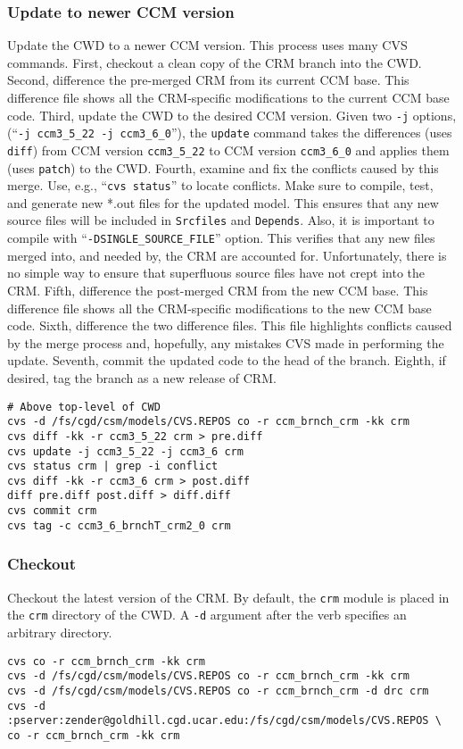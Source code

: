 \documentclass[12pt,twoside]{article}
\begin{document}
\subsubsection[Update]{Update to newer CCM version}
Update the CWD to a newer CCM version.
This process uses many CVS commands.
First, checkout a clean copy of the CRM branch into the CWD.
Second, difference the pre-merged CRM from its current CCM base.
This difference file shows all the CRM-specific modifications to the
current CCM base code.
Third, update the CWD to the desired CCM version.
Given two \verb'-j' options, (``\texttt{-j ccm3\_5\_22 -j
ccm3\_6\_0}''), the \verb'update' command takes the differences (uses
\verb'diff') from CCM version \verb'ccm3_5_22' to CCM version
\verb'ccm3_6_0' and applies them (uses \verb'patch') to the CWD.
Fourth, examine and fix the conflicts caused by this merge.
Use, e.g., ``\texttt{cvs status}'' to locate conflicts.
Make sure to compile, test, and generate new *.out files for the
updated model.
This ensures that any new source files will be included in
\verb'Srcfiles' and \verb'Depends'.
Also, it is important to compile with
``\texttt{-DSINGLE\_SOURCE\_FILE}'' option.
This verifies that any new files merged into, and needed by, the CRM
are accounted for.
Unfortunately, there is no simple way to ensure that superfluous
source files have not crept into the CRM.
Fifth, difference the post-merged CRM from the new CCM base.
This difference file shows all the CRM-specific modifications to the
new CCM base code.
Sixth, difference the two difference files.
This file highlights conflicts caused by the merge process and,
hopefully, any mistakes CVS made in performing the update.
Seventh, commit the updated code to the head of the branch.
Eighth, if desired, tag the branch as a new release of CRM.
\begin{verbatim}
# Above top-level of CWD
cvs -d /fs/cgd/csm/models/CVS.REPOS co -r ccm_brnch_crm -kk crm
cvs diff -kk -r ccm3_5_22 crm > pre.diff
cvs update -j ccm3_5_22 -j ccm3_6 crm
cvs status crm | grep -i conflict
cvs diff -kk -r ccm3_6 crm > post.diff
diff pre.diff post.diff > diff.diff
cvs commit crm
cvs tag -c ccm3_6_brnchT_crm2_0 crm
\end{verbatim}

\subsubsection[Checkout]{Checkout}
Checkout the latest version of the CRM. 
By default, the \verb'crm' module is placed in the \verb'crm'
directory of the CWD. 
A \verb'-d' argument after the verb specifies an arbitrary
directory.
\begin{verbatim}
cvs co -r ccm_brnch_crm -kk crm
cvs -d /fs/cgd/csm/models/CVS.REPOS co -r ccm_brnch_crm -kk crm
cvs -d /fs/cgd/csm/models/CVS.REPOS co -r ccm_brnch_crm -d drc crm
cvs -d :pserver:zender@goldhill.cgd.ucar.edu:/fs/cgd/csm/models/CVS.REPOS \
co -r ccm_brnch_crm -kk crm
\end{verbatim}
\end{document}
